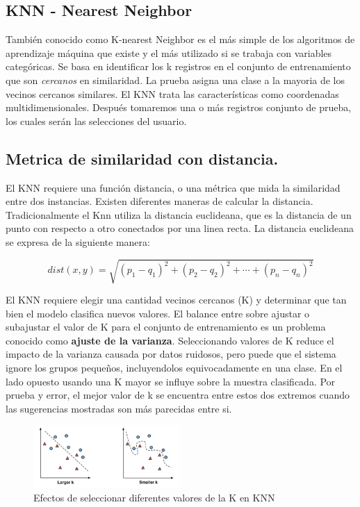 \subsection{KNN - Nearest Neighbor}
También conocido como K-nearest Neighbor es el más simple de los algoritmos de aprendizaje máquina que existe y el más utilizado si se trabaja con variables categóricas. Se basa en identificar los k  registros en el conjunto de entrenamiento que son \emph{cercanos} en similaridad. La prueba asigna una clase a la mayoria de los vecinos cercanos similares. El KNN trata las características como coordenadas multidimensionales. Después tomaremos una o más registros conjunto de prueba, los cuales serán las selecciones del usuario. 

\subsection{Metrica de similaridad con distancia.}

El KNN requiere una función distancia, o una métrica que mida la similaridad entre dos instancias. Existen diferentes maneras de calcular la distancia. Tradicionalmente el Knn utiliza la distancia euclideana, que es la distancia de un punto con respecto a otro conectados por una linea recta. La distancia euclideana se expresa de la siguiente manera:

\begin{equation}
dist(x,y) = \sqrt{(p_1-q_1)^2 + (p_2-q_2)^2+ \cdots + (p_n - q_n)^2}
\end{equation}

El KNN requiere elegir una cantidad  vecinos cercanos (K) y  determinar que tan bien el modelo clasifica nuevos valores. El balance entre sobre ajustar o subajustar el valor de K para el conjunto de entrenamiento es un problema conocido como \textbf{ajuste de la varianza}. Seleccionando valores de K reduce el impacto de la varianza causada por datos ruidosos, pero puede que el sistema ignore los grupos pequeños, incluyendolos equivocadamente en una clase. En el lado opuesto usando una K mayor se influye sobre la muestra clasificada. Por prueba y error, el mejor valor de k se encuentra entre estos dos extremos cuando las sugerencias mostradas son más parecidas entre si.


\begin{figure}[ht]
\centering
\includegraphics[width=0.5\textwidth]{IMG_0061.png}
\caption{Efectos de seleccionar diferentes valores  de la K en KNN}
\end{figure}



